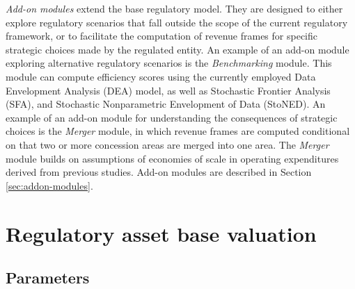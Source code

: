 \emph{Add-on modules} extend the base regulatory model. They are designed to either explore regulatory scenarios that fall outside the scope of the current regulatory framework, or to facilitate the computation of revenue frames for specific strategic choices made by the regulated entity. An example of an add-on module exploring alternative regulatory scenarios is the \emph{Benchmarking} module. This module can compute efficiency scores using the currently employed Data Envelopment Analysis (DEA) model, as well as Stochastic Frontier Analysis (SFA), and Stochastic Nonparametric Envelopment of Data (StoNED). An example of an add-on module for understanding the consequences of strategic choices is the \emph{Merger} module, in which revenue frames are computed conditional on that two or more concession areas are merged into one area. The \emph{Merger} module builds on assumptions of economies of scale in operating expenditures derived from previous studies. Add-on modules are described in Section \ref{sec:addon-modules}.


\section{Regulatory asset base valuation}

\subsection{Parameters}

